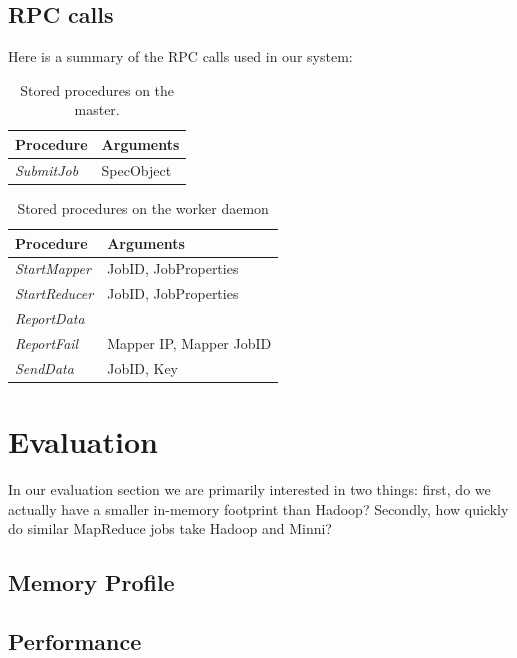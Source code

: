 \documentclass[10pt,letter,final,article,twocolumn]{article} %
\newcommand{\rpc}[1]{\emph{#1}}
\begin{document}
\subsection{RPC calls}

Here is a summary of the RPC calls used in our system:

\begin{table}[htdp]
\caption{Stored procedures on the master.}
\begin{center}
\begin{tabular}{|l|l|}\hline
\textbf{Procedure} & \textbf{Arguments}\\\hline
\rpc{SubmitJob} & SpecObject\\
\end{tabular}
\end{center}
\label{tab:master_rpc}
\end{table}%

\begin{table}[htdp]
\caption{Stored procedures on the worker daemon}
\begin{center}
\begin{tabular}{|l|l|}\hline
\textbf{Procedure} & \textbf{Arguments}\\\hline
\rpc{StartMapper} & JobID, JobProperties\\
\rpc{StartReducer} & JobID,  JobProperties\\
\rpc{ReportData} & \\
\rpc{ReportFail} & Mapper IP, Mapper JobID\\
\rpc{SendData} & JobID, Key\\
\end{tabular}
\end{center}
\label{tab:worker_rpc}
\end{table}%



\section{Evaluation}
In our evaluation section we are primarily interested in two things: first, do we actually have a smaller in-memory footprint than Hadoop? Secondly, how quickly do similar MapReduce jobs take Hadoop and Minni?
\subsection{Memory Profile}
\subsection{Performance}




\end{document}
